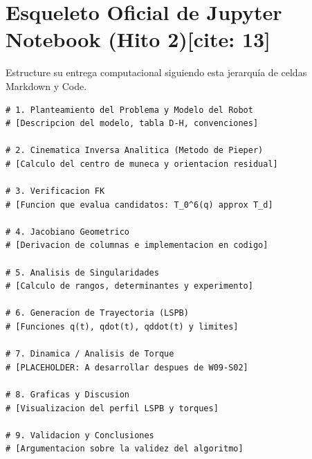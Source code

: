 \documentclass[11pt, a4paper]{article}
\begin{document}
\section*{Esqueleto Oficial de Jupyter Notebook (Hito 2)[cite: 13]}
Estructure su entrega computacional siguiendo esta jerarquía de celdas Markdown y Code.

\begin{lstlisting}
# 1. Planteamiento del Problema y Modelo del Robot
# [Descripcion del modelo, tabla D-H, convenciones]

# 2. Cinematica Inversa Analitica (Metodo de Pieper)
# [Calculo del centro de muneca y orientacion residual]

# 3. Verificacion FK
# [Funcion que evalua candidatos: T_0^6(q) approx T_d]

# 4. Jacobiano Geometrico
# [Derivacion de columnas e implementacion en codigo]

# 5. Analisis de Singularidades
# [Calculo de rangos, determinantes y experimento]

# 6. Generacion de Trayectoria (LSPB)
# [Funciones q(t), qdot(t), qddot(t) y limites]

# 7. Dinamica / Analisis de Torque
# [PLACEHOLDER: A desarrollar despues de W09-S02]

# 8. Graficas y Discusion
# [Visualizacion del perfil LSPB y torques]

# 9. Validacion y Conclusiones
# [Argumentacion sobre la validez del algoritmo]
\end{lstlisting}
\end{document}
